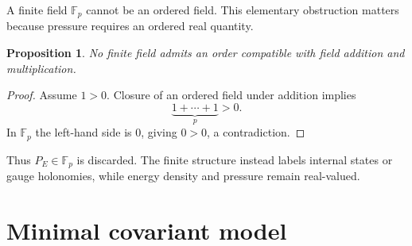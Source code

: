 \documentclass[11pt]{article}
\newtheorem{proposition}{Proposition}
\begin{document}
A finite field $\mathbb F_p$ cannot be an ordered field.  This elementary obstruction matters because pressure requires an ordered real quantity.

\begin{proposition}
No finite field admits an order compatible with field addition and multiplication.
\end{proposition}

\begin{proof}
Assume $1>0$.  Closure of an ordered field under addition implies
\[
\underbrace{1+\cdots+1}_{p}>0.
\]
In $\mathbb F_p$ the left-hand side is $0$, giving $0>0$, a contradiction.
\end{proof}

Thus $P_E\in\mathbb F_p$ is discarded.  The finite structure instead labels internal states or gauge holonomies, while energy density and pressure remain real-valued.

\section{Minimal covariant model}
\end{document}
